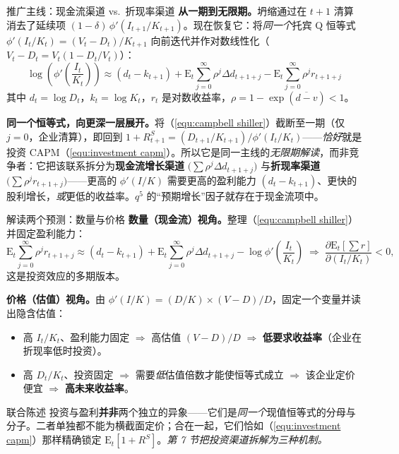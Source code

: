\documentclass{beamer}
\begin{document}
\begin{frame}{推广主线：现金流渠道 vs.\ 折现率渠道}
    \textbf{从一期到无限期。}坍缩通过在 $t+1$ 清算消去了延续项 $(1-\delta)\,\phi'(I_{t+1}/K_{t+1})$。现在恢复它：将\emph{同一个}托宾 Q 恒等式 $\phi'(I_t/K_t)=(V_t-D_t)/K_{t+1}$ 向前迭代并作对数线性化（$V_t-D_t=V_t(1-D_t/V_t)$）：
    \begin{equation}\label{equ:campbell shiller}
        \log\left(\phi'\left(\frac{I_t}{K_t}\right)\right) \approx (d_t - k_{t+1}) + \mathrm{E}_t \sum_{j=0}^{\infty} \rho^j \Delta d_{t+1+j} - \mathrm{E}_t \sum_{j=0}^{\infty} \rho^j r_{t+1+j}
    \end{equation}
    其中 $d_t=\log D_t$，$k_t=\log K_t$，$r_t$ 是对数收益率，$\rho=1-\exp(\overline{d-v})<1$。

    \vspace{0.1cm}
    \textbf{同一个恒等式，向更深一层展开。}将（\ref{equ:campbell shiller}）截断至一期（仅 $j=0$，企业清算），即回到 $1+R^S_{t+1}=(D_{t+1}/K_{t+1})/\phi'(I_t/K_t)$——\textit{恰好}就是投资 CAPM（\ref{equ:investment capm}）。所以它是同一主线的\emph{无限期解读}，而非竞争者：它把该联系拆分为\textbf{现金流增长渠道} $\big(\sum\rho^j\Delta d_{t+1+j}\big)$ 与\textbf{折现率渠道} $\big(\sum\rho^j r_{t+1+j}\big)$——更高的 $\phi'(I/K)$ 需要更高的盈利能力 $(d_t-k_{t+1})$、更快的股利增长，\textit{或}更低的收益率。$q^5$ 的“预期增长”因子就存在于现金流项中。
\end{frame}

\begin{frame}{解读两个预测：数量与价格}
    \textbf{数量（现金流）视角。}整理（\ref{equ:campbell shiller}）并固定盈利能力：
    \begin{equation*}
        \mathrm{E}_t \sum_{j=0}^{\infty} \rho^j r_{t+1+j} \approx (d_t - k_{t+1}) + \mathrm{E}_t \sum_{j=0}^{\infty} \rho^j \Delta d_{t+1+j} - \log\phi'\!\left(\frac{I_t}{K_t}\right)
        \;\Rightarrow\; \frac{\partial \mathrm{E}_t[\sum r]}{\partial (I_t/K_t)} < 0,
    \end{equation*}
    这是投资效应的多期版本。

    \vspace{0.15cm}
    \textbf{价格（估值）视角。}由 $\phi'(I/K)=(D/K)\times (V-D)/D$，固定一个变量并读出隐含估值：
    \begin{itemize}
        \item 高 $I_t/K_t$、盈利能力固定 $\Rightarrow$ 高估值 $(V-D)/D$ $\Rightarrow$ \textbf{低要求收益率}（企业在折现率低时投资）。
        \item 高 $D_t/K_t$、投资固定 $\Rightarrow$ 需要\textit{低}估值倍数才能使恒等式成立 $\Rightarrow$ 该企业定价便宜 $\Rightarrow$ \textbf{高未来收益率}。
    \end{itemize}
    \begin{block}{联合陈述}
        投资与盈利\textbf{并非}两个独立的异象——它们是\textit{同一个}现值恒等式的分母与分子。二者单独都不能为横截面定价；合在一起，它们恰如（\ref{equ:investment capm}）那样精确锁定 $\mathrm{E}_t[1+R^S]$。\textit{第 7 节把投资渠道拆解为三种机制。}
    \end{block}
\end{frame}
\end{document}
